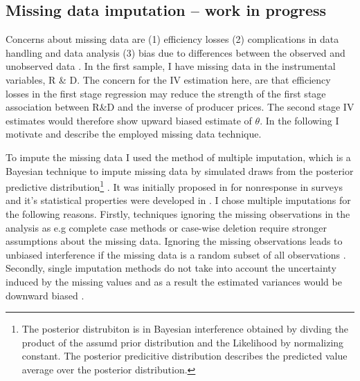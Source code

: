 \subsection{Missing data imputation -- work in progress}
Concerns about missing data are (1) efficiency losses (2) complications in data handling and data analysis (3) bias due to differences between the observed and unobserved data \parencite{schafer1998multiple}.
In the first sample, I have missing data in the instrumental variables, R \& D.
The concern for the IV estimation here, are that efficiency losses in the first stage regression may reduce the strength of the first stage association between R\&D and the inverse of producer prices.
 The second stage IV estimates would therefore show upward biased estimate of $\theta$.
In the following I motivate and describe the employed missing data technique.  \par
To impute the missing data I used the method of multiple imputation, which is a Bayesian technique to impute missing data by simulated draws from the posterior predictive distribution\footnote{The posterior distrubiton is in Bayesian interference obtained by divding the product of the assumd prior distribution and the Likelihood by normalizing constant.
The  posterior predicitive distribution describes the predicted value average over the posterior distribution. } \textcite{Rubin1987}.
It was initially proposed in \textcite{rubin1978} for nonresponse in surveys and it's statistical properties were developed in  \textcite{Rubin1987}.
I chose multiple imputations for the following reasons.
Firstly, techniques  ignoring the missing observations in the analysis as e.g complete case methods or case-wise deletion require stronger assumptions about the missing data.
Ignoring the missing observations leads to unbiased interference if the missing data is a random subset of all observations \parencite{bhaskaran}.
Secondly, single imputation methods do not take into account the uncertainty induced by the missing values and
as a result the estimated variances would be downward biased \parencite{Wooldridge}.
